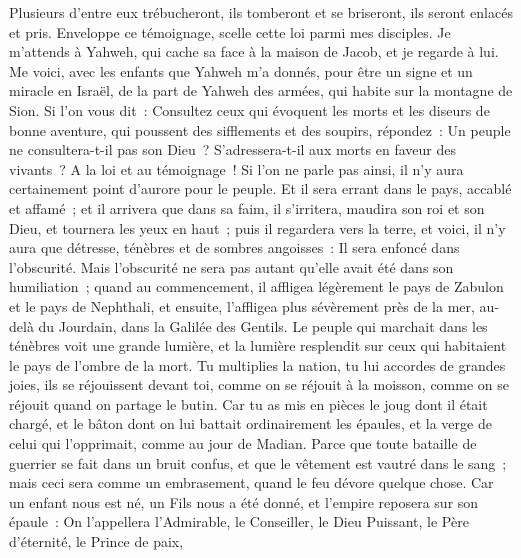 \begin{multicols}{2}
Plusieurs d'entre eux trébucheront, ils tomberont et se briseront, ils seront enlacés et pris.
Enveloppe ce témoignage, scelle cette loi parmi mes disciples.
Je m'attends à Yahweh, qui cache sa face à la maison de Jacob, et je regarde à lui.
Me voici, avec les enfants que Yahweh m'a donnés, pour être un signe et un miracle en Israël, de la part de Yahweh des armées, qui habite sur la montagne de Sion.
Si l'on vous dit~: Consultez ceux qui évoquent les morts et les diseurs de bonne aventure, qui poussent des sifflements et des soupirs, répondez~: Un peuple ne consultera-t-il pas son Dieu~? S'adressera-t-il aux morts en faveur des vivants~?
A la loi et au témoignage~! Si l'on ne parle pas ainsi, il n'y aura certainement point d'aurore pour le peuple.
Et il sera errant dans le pays, accablé et affamé~; et il arrivera que dans sa faim, il s'irritera, maudira son roi et son Dieu, et tournera les yeux en haut~;
puis il regardera vers la terre, et voici, il n'y aura que détresse, ténèbres et de sombres angoisses~: Il sera enfoncé dans l'obscurité.
Mais l'obscurité ne sera pas autant qu'elle avait été dans son humiliation~; quand au commencement, il affligea légèrement le pays de Zabulon et le pays de Nephthali, et ensuite, l'affligea plus sévèrement près de la mer, au-delà du Jourdain, dans la Galilée des Gentils.
\VerseOne{}Le peuple qui marchait dans les ténèbres voit une grande lumière, et la lumière resplendit sur ceux qui habitaient le pays de l'ombre de la mort.
Tu multiplies la nation, tu lui accordes de grandes joies, ils se réjouissent devant toi, comme on se réjouit à la moisson, comme on se réjouit quand on partage le butin.
Car tu as mis en pièces le joug dont il était chargé, et le bâton dont on lui battait ordinairement les épaules, et la verge de celui qui l'opprimait, comme au jour de Madian.
Parce que toute bataille de guerrier se fait dans un bruit confus, et que le vêtement est vautré dans le sang~; mais ceci sera comme un embrasement, quand le feu dévore quelque chose.
Car un enfant nous est né, un Fils nous a été donné, et l'empire reposera sur son épaule~: On l'appellera l'Admirable, le Conseiller, le Dieu Puissant, le Père d'éternité, le Prince de paix,

\end{multicols}
